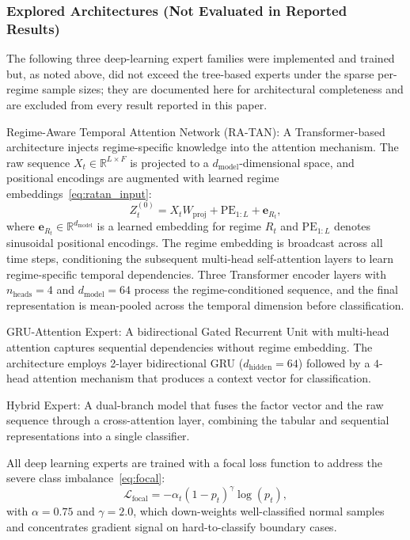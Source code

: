 \documentclass[]{interact}
\begin{document}
\subsubsection{Explored Architectures (Not Evaluated in Reported Results)}
\label{subsubsec:explored}

The following three deep-learning expert families were implemented and trained but, as noted above, did not exceed the tree-based experts under the sparse per-regime sample sizes; they are documented here for architectural completeness and are excluded from every result reported in this paper.

Regime-Aware Temporal Attention Network (RA-TAN): A Transformer-based architecture injects regime-specific knowledge into the attention mechanism. The raw sequence $X_t \in \mathbb{R}^{L \times F}$ is projected to a $d_{\text{model}}$-dimensional space, and positional encodings are augmented with learned regime embeddings~\eqref{eq:ratan_input}:
\begin{equation}
    Z_t^{(0)} = X_t W_{\text{proj}} + \text{PE}_{1:L} + \mathbf{e}_{R_t},
    \label{eq:ratan_input}
\end{equation}
where $\mathbf{e}_{R_t} \in \mathbb{R}^{d_{\text{model}}}$ is a learned embedding for regime $R_t$ and $\text{PE}_{1:L}$ denotes sinusoidal positional encodings. The regime embedding is broadcast across all time steps, conditioning the subsequent multi-head self-attention layers to learn regime-specific temporal dependencies. Three Transformer encoder layers with $n_{\text{heads}} = 4$ and $d_{\text{model}} = 64$ process the regime-conditioned sequence, and the final representation is mean-pooled across the temporal dimension before classification.

GRU-Attention Expert: A bidirectional Gated Recurrent Unit with multi-head attention captures sequential dependencies without regime embedding. The architecture employs 2-layer bidirectional GRU ($d_{\text{hidden}} = 64$) followed by a $4$-head attention mechanism that produces a context vector for classification.

Hybrid Expert: A dual-branch model that fuses the factor vector and the raw sequence through a cross-attention layer, combining the tabular and sequential representations into a single classifier.

All deep learning experts are trained with a focal loss function \citep{lin2017focal} to address the severe class imbalance~\eqref{eq:focal}:
\begin{equation}
    \mathcal{L}_{\text{focal}} = -\alpha_t (1 - p_t)^{\gamma} \log(p_t),
    \label{eq:focal}
\end{equation}
with $\alpha = 0.75$ and $\gamma = 2.0$, which down-weights well-classified normal samples and concentrates gradient signal on hard-to-classify boundary cases.
\end{document}
